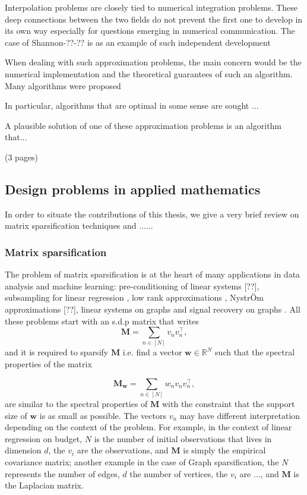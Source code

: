 \documentclass[twoside,11pt]{book}
\numberwithin{theorem}{chapter}
\numberwithin{definition}{chapter}
\numberwithin{proposition}{chapter}
\numberwithin{corollary}{chapter}
\numberwithin{example}{chapter}
\numberwithin{lemma}{chapter}
\DeclareMathOperator{\Tran}{\intercal}
\begin{document}
Interpolation problems are closely tied to numerical integration problems. These deep connections between the two fields do not prevent the first one to develop in its own way especially for questions emerging in numerical communication. The case of Shannon-??-?? is as an example of such independent development




When dealing with such approximation problems, the main concern would be the numerical implementation and the theoretical guarantees of such an algorithm. Many algorithms were proposed



In particular, algorithms that are optimal in some sense are sought ...

A plausible solution of one of these approximation problems is an algorithm that...


(3 pages)
\subsection{Design problems in applied mathematics}
In order to situate the contributions of this thesis, we give a very brief review on  matrix sparsification techniques and ......
\subsubsection{Matrix sparsification}
The problem of matrix sparsification is at the heart of many applications in data analysis and machine learning: pre-conditioning of linear systems [??], subsampling for linear regression \citep*{DrMaMu06}, low rank approximations \citep*{DrMaMu07}, NystrÖm approximations [??], linear systems on graphs \citep*{SpTe04,SpSr11} and signal recovery on graphs \citep*{PuTrGrVa18}. All these problems start with an s.d.p matrix that writes
\begin{equation}
\bm{M} = \sum\limits_{n \in [N]} v_{n}v_{n}^{\Tran},
\end{equation}
and it is required to sparsify $\bm{M}$ i.e. find a vector $\bm{w} \in \mathbb{R}^{N}$ such that the spectral properties of the matrix

\begin{equation}
\bm{M}_{\bm{w}} = \sum\limits_{n \in [N]} w_{n} v_{n}v_{n}^{\Tran},
\end{equation}
are similar to the spectral properties of $\bm{M}$ with the constraint that the support size of $\bm{w}$ is as small as possible. 
The vectors $v_{n}$ may have different interpretation depending on the context of the problem. For example, in the context of linear regression on budget, $N$ is the number of initial observations that lives in dimension $d$, the $v_{i}$ are the observations, and $\bm{M}$ is simply the empirical covariance matrix; another example in the case of Graph sparsification, the $N$ represents the number of edges, $d$ the number of vertices, the $v_{i}$ are ..., and $\bm{M}$ is the Laplacian matrix.
\end{document}
